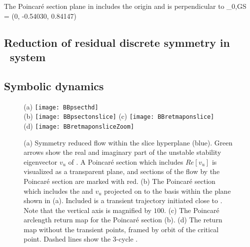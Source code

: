 The Poincar\'e section plane in  includes the origin 
and is
perpendicular to
\beq
	_{0,GS} = (0, -0.54030, 0.84147)
	\label{eq:nhat0GS-1}
\eeq


\subsection{Reduction of residual discrete symmetry in \twomode\ system}


\subsection{Symbolic dynamics}


\begin{figure}
\centering
  (a) \texttt{[image: BBpsecthd]} \\
  (b) \texttt{[image: BBpsectonslice]}
  (c) \texttt{[image: BBretmaponslice]} \\
  (d) \texttt{[image: BBretmaponsliceZoom]}
\caption{(a) Symmetry reduced flow within the slice hyperplane (blue).
			Green arrows show the real and imaginary part of the unstable stability
			eigenvector $v_u$ of . A Poincar\'e section which includes
			$Re[v_u]$ is visualized as a transparent plane, and sections
			of the flow by the Poincar\'e section are marked with red.
		 (b) The Poincar\'e section which includes the  and $v_u$ projected
			on to the basis within the plane shown in (a). Included is a
            transient trajectory initiated close to . Note that
		  	the vertical axis is magnified by $100$.
		 (c) The Poincar\'e arclength return map for the
		    Poincar\'e section (b).
		 (d) The return map without the transient points, framed by
            orbit of the critical point.
		 	Dashed lines show the 3-cycle .}
\label{fig:psectandretmap}
\end{figure}

